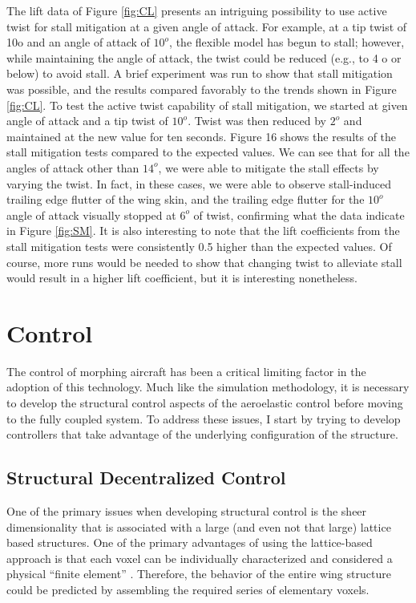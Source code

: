 \documentclass[11pt]{ucthesis}
\begin{document}
The lift data of Figure \ref{fig:CL} presents an intriguing possibility to use active twist for stall mitigation at a given angle of attack. For example, at a tip twist of 10o and an angle of attack of $10^o$, the flexible model has begun to stall; however, while maintaining the angle of attack, the twist could be reduced (e.g., to 4 o or below) to avoid stall. A brief experiment was run to show that stall mitigation was possible, and the results compared favorably to the trends shown in Figure \ref{fig:CL}.
To test the active twist capability of stall mitigation, we started at given angle of attack and a tip twist of $10^o$. Twist was then reduced by $2^o$ and maintained at the new value for ten seconds. Figure 16 shows the results of the stall mitigation tests compared to the expected values. We can see that for all the angles of attack other than $14^o$, we were able to mitigate the stall effects by varying the twist. In fact, in these cases, we were able to observe stall-induced trailing edge flutter of the wing skin, and the trailing edge flutter for the $10^o$ angle of attack visually stopped at $6^o$ of twist, confirming what the data indicate in Figure \ref{fig:SM}. It is also interesting to note that the lift coefficients from the stall mitigation tests were consistently 0.5 higher than the expected values. Of course, more runs would be needed to show that changing twist to alleviate stall would result in a higher lift coefficient, but it is interesting nonetheless.



\chapter{Control}
The control of morphing aircraft has been a critical limiting factor in the adoption of this technology. Much like the simulation methodology, it is necessary to develop the structural control aspects of the aeroelastic control before moving to the fully coupled system. To address these issues, I start by trying to develop controllers that take advantage of the underlying configuration of the structure.

\section{Structural Decentralized Control}
\label{sec:decentral}
One of the primary issues when developing structural control is the sheer dimensionality that is associated with a large (and even not that large) lattice based structures. One of the primary advantages of using the lattice-based approach is that each voxel can be individually characterized and considered a physical ``finite element'' \cite{calisch2014physical}. Therefore, the behavior of the entire wing structure could be predicted by assembling the required series of elementary voxels. 
\end{document}
